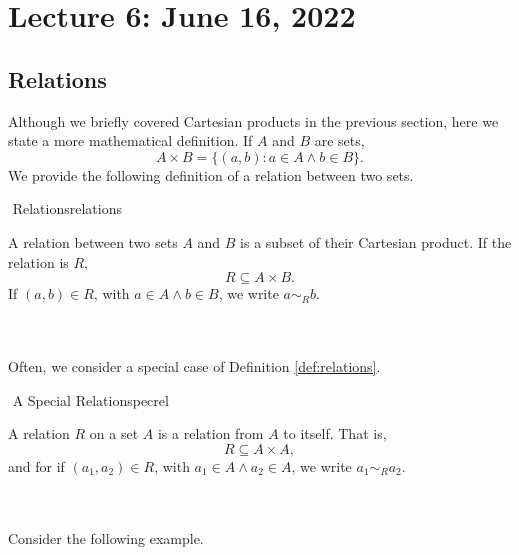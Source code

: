     \pagebreak
        
\section{Lecture 6: June 16, 2022}
        
    \subsection{Relations}
        
        Although we briefly covered Cartesian products in the previous section, here we state a more mathematical definition. If \(A\) and \(B\) are sets,
        \begin{equation*}
            A\times B=\{(a,b):a\in A\wedge b\in B\}.
        \end{equation*}
        We provide the following definition of a relation between two sets.
        \begin{definition}{\Stop\,\,Relations}{relations}
        
            A relation between two sets \(A\) and \(B\) is a subset of their Cartesian product. If the relation is \(R\), 
            \begin{equation*}
                R\subseteq A\times B.
            \end{equation*}
            If \((a,b)\in R\), with \(a\in A\wedge b\in B\), we write \(a\sim_R b\).
        \end{definition}
        \vphantom
        \\
        \\
        Often, we consider a special case of Definition \ref{def:relations}.
        \begin{definition}{\Stop\,\,A Special Relation}{specrel}
        
            A relation \(R\) on a set \(A\) is a relation from \(A\) to itself. That is, 
            \begin{equation*}
                R\subseteq A\times A,
            \end{equation*}
            and for if \((a_1,a_2)\in R\), with \(a_1\in A\wedge a_2\in A\), we write \(a_1\sim_Ra_2\).
        
        \end{definition}
        \vphantom
        \\
        \\
        Consider the following example.
